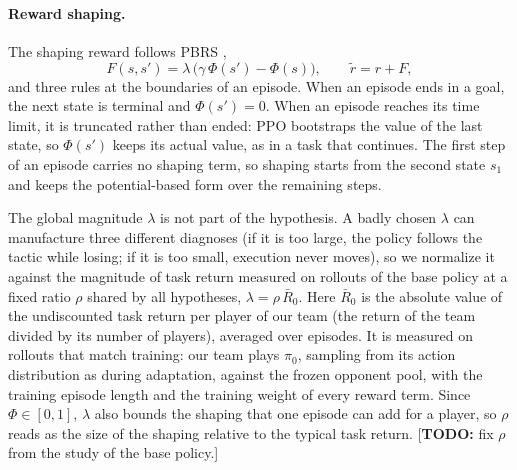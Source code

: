 \documentclass[11pt]{article}
\newcommand{\todo}[1]{\textcolor{BrickRed}{[\textbf{TODO:} #1]}}
\begin{document}
\paragraph{Reward shaping.}
The shaping reward follows PBRS \citep{ng1999policy},
\begin{equation}
  F(s,s') = \lambda\,\bigl(\gamma\,\Phi(s') - \Phi(s)\bigr), \qquad \tilde r = r + F,
  \label{eq:pbrs}
\end{equation}
and three rules at the boundaries of an episode.
When an episode ends in a goal, the next state is terminal and $\Phi(s') = 0$.
When an episode reaches its time limit, it is truncated rather than ended: PPO bootstraps the value of the last state, so $\Phi(s')$ keeps its actual value, as in a task that continues.
The first step of an episode carries no shaping term, so shaping starts from the second state $s_1$ and keeps the potential-based form over the remaining steps.

The global magnitude $\lambda$ is not part of the hypothesis.
A badly chosen $\lambda$ can manufacture three different diagnoses (if it is too large, the policy follows the tactic while losing; if it is too small, execution never moves), so we normalize it against the magnitude of task return measured on rollouts of the base policy at a fixed ratio $\rho$ shared by all hypotheses, $\lambda = \rho\,\bar R_0$.
Here $\bar R_0$ is the absolute value of the undiscounted task return per player of our team (the return of the team divided by its number of players), averaged over episodes.
It is measured on rollouts that match training: our team plays $\pi_0$, sampling from its action distribution as during adaptation, against the frozen opponent pool, with the training episode length and the training weight of every reward term.
Since $\Phi \in [0,1]$, $\lambda$ also bounds the shaping that one episode can add for a player, so $\rho$ reads as the size of the shaping relative to the typical task return.
\todo{fix $\rho$ from the study of the base policy.}
\end{document}
